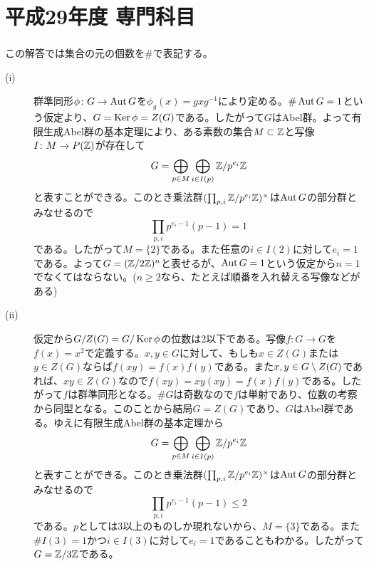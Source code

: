 
\section{平成29年度 専門科目}

\subsubsection{} %
\begin{sol} この解答では集合の元の個数を$\#$で表記する。
   \begin{description}
     \item[(i)] 群準同形$\phi \colon G \to \operatorname{Aut} G$を$\phi_g(x)=gxg^{-1}$により定める。$\# \operatorname{Aut} G = 1$という仮定より、$G = \operatorname{Ker} \phi = Z(G)$である。したがって$G$はAbel群。よって有限生成Abel群の基本定理により、ある素数の集合$M \subset {\mathbb Z}$と写像$I \colon M \to P({\mathbb Z})$が存在して
     \[
     G = \bigoplus_{p \in M} \bigoplus_{i \in I(p)} {\mathbb Z} / p^{e_i} {\mathbb Z}
     \]
     と表すことができる。このとき乗法群$(\prod_{p, i } {\mathbb Z} / p^{e_i} {\mathbb Z})^{\times}$は$\operatorname{Aut} G$の部分群とみなせるので
     \[
     \prod_{p, i} p^{e_i - 1}(p -1) = 1
     \]
     である。したがって$M=\{ 2 \}$である。また任意の$i \in I(2)$に対して$e_i = 1$である。よって$G = ({\mathbb Z} / 2 {\mathbb Z})^n$と表せるが、$\operatorname{Aut} G = 1$という仮定から$n=1$でなくてはならない。($n \geq 2$なら、たとえば順番を入れ替える写像などがある)
     \item[(ii)] 仮定から$G/ Z(G) = G/ \operatorname{Ker} \phi $の位数は2以下である。写像$f \colon G \to G$を$f(x) = x^2$で定義する。$x,y \in G$に対して、もしも$x \in Z(G)$または$y \in Z(G)$ならば$f(xy)=f(x)f(y)$である。また$x , y \in G \setminus Z(G)$であれば、$xy \in Z(G)$なので$f(xy)=xy(xy) =f(x)f(y)$である。したがって$f$は群準同形となる。$\# G$は奇数なので$f$は単射であり、位数の考察から同型となる。このことから結局$G= Z(G)$であり、$G$はAbel群である。ゆえに有限生成Abel群の基本定理から
     \[
        G = \bigoplus_{p \in M} \bigoplus_{i \in I(p)} {\mathbb Z} / p^{e_i} {\mathbb Z}
     \]
     と表すことができる。このとき乗法群$(\prod_{p, i } {\mathbb Z} / p^{e_i} {\mathbb Z})^{\times}$は$\operatorname{Aut} G$の部分群とみなせるので
     \[
     \prod_{p, i} p^{e_i - 1}(p -1) \leq 2
     \]
     である。$p$としては$3$以上のものしか現れないから、$M = \{ 3 \}$である。また$\# I(3) =1$かつ$i \in I(3)$に対して$e_i = 1$であることもわかる。したがって$G = {\mathbb Z} / 3{\mathbb Z}$である。
   \end{description}
\end{sol}

